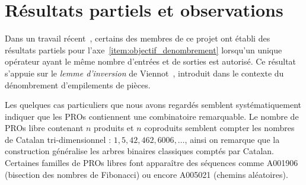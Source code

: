 \documentclass[10pt,reqno]{amsart}
\numberwithin{equation}{subsection}
\begin{document}
\section{Résultats partiels et observations}
Dans un travail récent~\cite{BG14}, certains des membres de ce projet 
ont établi des résultats partiels pour 
l'axe~\eqref{item:objectif_denombrement} lorsqu'un unique opérateur 
ayant le même nombre d'entrées et de sorties est autorisé. Ce résultat 
s'appuie sur le {\em lemme d'inversion} de Viennot~\cite{Vie86},
introduit dans le contexte du dénombrement d'empilements de pièces. 


Les quelques cas particuliers que nous avons regardés semblent
systématiquement indiquer que les PROs contiennent une combinatoire
remarquable. Le nombre de PROs libre contenant $n$ produits et $n$
coproduits semblent compter les nombres de Catalan tri-dimensionnel :
$1, 5, 42, 462, 6006, \dots$, ainsi on remarque que la construction
généralise les arbres binaires classiques comptés par
Catalan. Certaines familles de PROs libres font apparaître des
séquences comme A001906 (bisection des nombres de Fibonacci) ou encore
A005021 (chemins aléatoires).
\vspace{-0.4cm}
\end{document}
